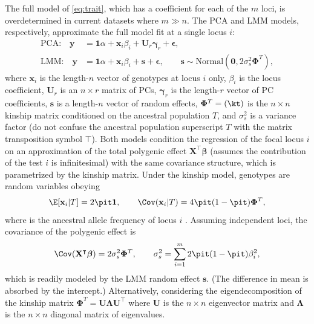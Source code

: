 \documentclass[11pt]{article}
\begin{document}
The full model of \cref{eq:trait}, which has a coefficient for each of the $m$ loci, is overdetermined in current datasets where $m \gg n$.
The PCA and LMM models, respectively, approximate the full model fit at a single locus $i$:
\begin{align}
  \label{eq:pca_gwas}
  \text{PCA:}\quad
  \mathbf{y}
  &=
  \mathbf{1} \alpha + \mathbf{x}_i \beta_i + \mathbf{U}_r \boldsymbol{\gamma}_r + \boldsymbol{\epsilon}
  , \\
  \label{eq:lmm_gwas}
  \text{LMM:}\quad
  \mathbf{y}
  &=
  \mathbf{1} \alpha + \mathbf{x}_i \beta_i + \mathbf{s} + \boldsymbol{\epsilon}
    ,
    \quad\quad
    \mathbf{s} \sim \text{Normal} \left( \mathbf{0}, 2 \sigma^2_s \mathbf{\Phi}^T \right),
\end{align}
where $\mathbf{x}_i$ is the length-$n$ vector of genotypes at locus $i$ only,
$\beta_i$ is the locus coefficient,
$\mathbf{U}_r$ is an $n \times r$ matrix of PCs,
$\boldsymbol{\gamma}_r$ is the length-$r$ vector of PC coefficients,
$\mathbf{s}$ is a length-$n$ vector of random effects,
$\mathbf{\Phi}^T = (\kt)$ is the $n \times n$ kinship matrix conditioned on the ancestral population $T$,
and $\sigma^2_s$ is a variance factor (do not confuse the ancestral population superscript $T$ with the matrix transposition symbol $\intercal$).
Both models condition the regression of the focal locus $i$ on an approximation of the total polygenic effect $\mathbf{X}^\intercal \boldsymbol{\beta}$ (assumes the contribution of the test $i$ is infinitesimal) with the same covariance structure, which is parametrized by the kinship matrix.
Under the kinship model, genotypes are random variables obeying
\begin{equation}
  \label{eq:kinship_model}
\E[ \mathbf{x}_i | T ]
=
2 \pit \mathbf{1},
\quad\quad
\Cov( \mathbf{x}_i | T )
=
4 \pit ( 1 - \pit ) \mathbf{\Phi}^T,
\end{equation}
where \pit is the ancestral allele frequency of locus $i$ \citep{malecot_mathematiques_1948, wright_genetical_1951, jacquard_structures_1970, astle_population_2009}.
Assuming independent loci, the covariance of the polygenic effect is
$$
\Cov( \mathbf{X}^\intercal \boldsymbol{\beta} ) = 2 \sigma^2_s \mathbf{\Phi}^T,
\quad\quad
\sigma^2_s = \sum_{i=1}^m 2 \pit ( 1 - \pit ) \beta_i^2,
$$
which is readily modeled by the LMM random effect $\mathbf{s}$.
(The difference in mean is absorbed by the intercept.)
Alternatively, considering the eigendecomposition of the kinship matrix $\mathbf{\Phi}^T = \mathbf{U} \mathbf{\Lambda} \mathbf{U}^\intercal$ where $\mathbf{U}$ is the $n \times n$ eigenvector matrix and $\mathbf{\Lambda}$ is the $n \times n$ diagonal matrix of eigenvalues.
\end{document}

